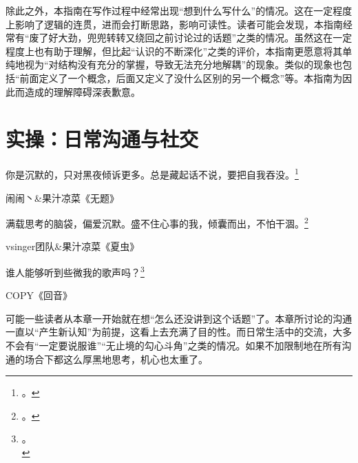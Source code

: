 \label{para:想到哪写到哪}除此之外，本指南在写作过程中经常出现“想到什么写什么”的情况。这在一定程度上影响了逻辑的连贯，进而会打断思路，影响可读性。读者可能会发现，本指南经常有“废了好大劲，兜兜转转又绕回之前讨论过的话题”之类的情况。虽然这在一定程度上也有助于理解，但比起“认识的不断深化”之类的评价，本指南更愿意将其单纯地视为“对结构没有充分的掌握，导致无法充分地解耦”的现象。类似的现象也包括“前面定义了一个概念，后面又定义了没什么区别的另一个概念”等。本指南为因此而造成的理解障碍深表歉意。

\section{实操：日常沟通与社交\label{sec:日常沟通与社交}}
\hfill\begin{minipage}{0.6\textwidth}
\fontsize{8pt}{12pt}\selectfont\fontsize{8pt}{12pt}

\raggedright 你是沉默的，只对黑夜倾诉更多。总是藏起话不说，要把自我吞没。\footnote{\another{}。}

\raggedleft 闹闹丶\&果汁凉菜《无题》

\raggedright 满载思考的脑袋，偏爱沉默。盛不住心事的我，倾囊而出，不怕干涸。\footnote{\another{}。}

\raggedleft vsinger团队\&果汁凉菜《夏虫》

\raggedright 谁人能够听到些微我的歌声吗？\footnote{\another{}。\\}

\raggedleft COPY《回音》

\end{minipage}

可能一些读者从本章一开始就在想“怎么还没讲到这个话题”了。本章所讨论的沟通一直以“产生新认知”为前提，这看上去充满了目的性。而日常生活中的交流，大多不会有“一定要说服谁”“无止境的勾心斗角”之类的情况。如果不加限制地在所有沟通的场合下都这么厚黑地思考，机心也太重了。

